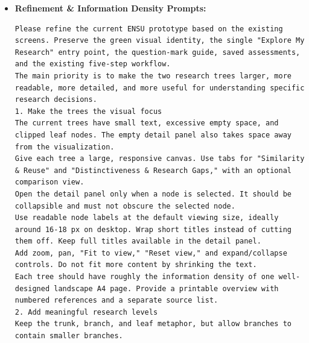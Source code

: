 \documentclass[11pt,a4paper]{article}
\begin{document}
\begin{itemize}[leftmargin=*]
\begin{lstlisting}
6. Make the prototype clear and demo-ready
Show both trees together on the results page, with a concise summary:
- What existing research can I build on?
- Where might my contribution be distinctive?
- Who nearby could help?
- What should I do next?
Include working actions such as "Edit Proposal," "Explore Evidence," and "Save Assessment."
Every evidence-based annotation should link to its underlying source where available. Clearly distinguish published evidence, inferred recommendations, and illustrative demo content. If repository integrations are unavailable, use clearly labeled sample data without implying live access to university systems.
For tomorrow's pitch, provide one preloaded example that demonstrates the complete journey, including both trees, several hover annotations, a source detail panel, and one campus collaboration opportunity.
The final experience should communicate one clear promise:
"Understand what you can build on, where you can contribute, and who nearby can help."
\end{lstlisting}
    \item \textbf{Refinement \& Information Density Prompts:}
    \begin{lstlisting}
Please refine the current ENSU prototype based on the existing screens. Preserve the green visual identity, the single "Explore My Research" entry point, the question-mark guide, saved assessments, and the existing five-step workflow.
The main priority is to make the two research trees larger, more readable, more detailed, and more useful for understanding specific research decisions.
1. Make the trees the visual focus
The current trees have small text, excessive empty space, and clipped leaf nodes. The empty detail panel also takes space away from the visualization.
Give each tree a large, responsive canvas. Use tabs for "Similarity & Reuse" and "Distinctiveness & Research Gaps," with an optional comparison view.
Open the detail panel only when a node is selected. It should be collapsible and must not obscure the selected node.
Use readable node labels at the default viewing size, ideally around 16-18 px on desktop. Wrap short titles instead of cutting them off. Keep full titles available in the detail panel.
Add zoom, pan, "Fit to view," "Reset view," and expand/collapse controls. Do not fit more content by shrinking the text.
Each tree should have roughly the information density of one well-designed landscape A4 page. Provide a printable overview with numbered references and a separate source list.
2. Add meaningful research levels
Keep the trunk, branch, and leaf metaphor, but allow branches to contain smaller branches.

\end{lstlisting}
\end{itemize}
\end{document}
